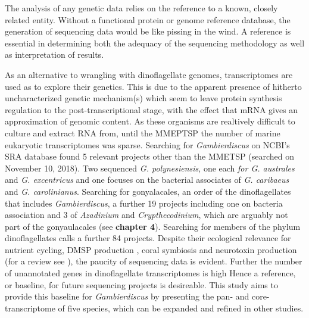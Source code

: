 \documentclass[12pt]{article}
\begin{document}

The analysis of any genetic data relies on the reference to a known, closely related entity. 
Without a functional protein or genome reference database, the generation of sequencing data would be like pissing in the wind. 
A reference is essential in determining both the adequacy of the sequencing methodology as well as interpretation of results. 
           

As an alternative to wrangling with dinoflagellate genomes, transcriptomes are used as to explore their genetics. 
This is due to the apparent presence of hitherto uncharacterized genetic mechanism(s) which seem to leave protein synthesis regulation to the post-transcriptional stage, with the effect that mRNA gives an approximation of genomic content. 
As these organisms are realtively difficult to culture and extract RNA from, until the MMEPTSP the number of marine eukaryotic transcriptomes was sparse. 
Searching for \textit{Gambierdiscus} on NCBI's SRA database found 5 relevant projects other than the MMETSP (searched on November 10, 2018). 
Two sequenced \textit{G. polynesiensis}, one each \textit{for G. australes} and \textit{G. excentricus} and one focuses on the bacterial associates of \textit{G. caribaeus} and \textit{G. carolinianus}.
Searching for gonyalacales, an order of the dinoflagellates that includes \textit{Gambierdiscus}, a further 19 projects including one on bacteria association and 3 of \textit{Azadinium} and \textit{Crypthecodinium}, which are arguably not part of the gonyaulacales (see \textbf{chapter 4}). 
Searching for members of the phylum dinoflagellates calls a further 84 projects. 
Despite their ecological relevance for nutrient cycling, DMSP production , coral symbiosis and neurotoxin production (for a review see \cite{murray2016unravelling}), the paucity of sequencing data is evident. 
Further the number of unannotated genes in dinoflagellate transcriptomes is high %
Hence a reference, or baseline, for future sequencing projects is desireable.
This study aims to provide this baseline for \textit{Gambierdiscus} by presenting the pan- and core- transcriptome of five species, which can be expanded and refined in other studies.
\end{document}
